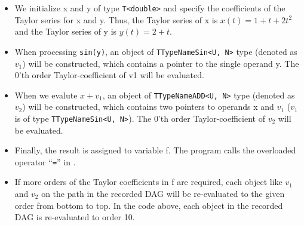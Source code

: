 \begin{itemize}
	\item We initialize x and y of type \texttt{T<double>} and specify the coefficients of the Taylor series for x and y. Thus, the Taylor series of x is $x(t)=1+t+2t^2$ and the Taylor series of y is $y(t)=2+t$.
	\item When processing \texttt{sin(y)}, an object of \texttt{TTypeNameSin<U, N>} type (denoted as $v_1$) will be constructed, which contains a pointer to the single operand y. The 0'th order Taylor-coefficient of v1 will be evaluated.
	\item When we evalute $x+v_1$, an object of \texttt{TTypeNameADD<U, N>} type (denoted as $v_2$) will be constructed, which contains two pointers to operands x and $v_1$ ($v_1$ is of type \texttt{TTypeNameSin<U, N>}). The 0'th order Taylor-coefficient of $v_2$ will be evaluated.
	\item Finally, the result is assigned to variable f. The program calls the overloaded operator ``{\tt =}'' in \fadiff.
	\item If more orders of the Taylor coefficients in f are required, each object like $v_1$ and $v_2$ on the path in the recorded DAG will be re-evaluated to the given order from bottom to top. In the code above, each object in the recorded DAG is re-evaluated to order 10.
\end{itemize}